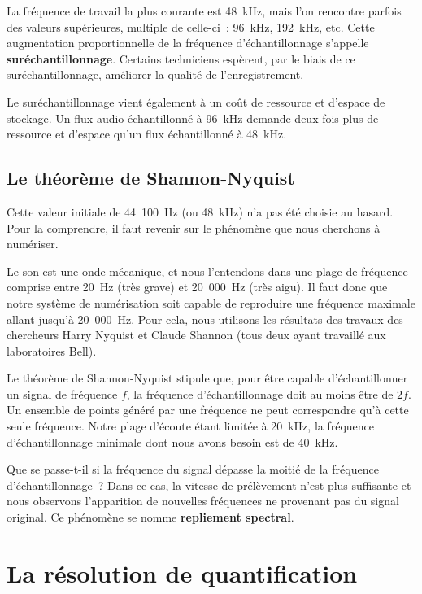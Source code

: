 \documentclass[
]{book}
\begin{document}
La fréquence de travail la plus courante est 48~kHz, mais l'on rencontre parfois des valeurs supérieures, multiple de celle-ci~: 96~kHz, 192~kHz, etc. Cette augmentation proportionnelle de la fréquence d'échantillonnage s'appelle \textbf{suréchantillonnage}. Certains techniciens espèrent, par le biais de ce suréchantillonnage, améliorer la qualité de l'enregistrement.

Le suréchantillonnage vient également à un coût de ressource et d'espace de stockage. Un flux audio échantillonné à 96~kHz demande deux fois plus de ressource et d'espace qu'un flux échantillonné à 48~kHz.

\hypertarget{le-thuxe9oruxe8me-de-shannon-nyquist}{%
\subsection{Le théorème de Shannon-Nyquist}\label{le-thuxe9oruxe8me-de-shannon-nyquist}}

Cette valeur initiale de 44~100~Hz (ou 48~kHz) n'a pas été choisie au hasard. Pour la comprendre, il faut revenir sur le phénomène que nous cherchons à numériser.

Le son est une onde mécanique, et nous l'entendons dans une plage de fréquence comprise entre 20~Hz (très grave) et 20~000~Hz (très aigu). Il faut donc que notre système de numérisation soit capable de reproduire une fréquence maximale allant jusqu'à 20~000~Hz. Pour cela, nous utilisons les résultats des travaux des chercheurs Harry Nyquist et Claude Shannon (tous deux ayant travaillé aux laboratoires Bell).

Le théorème de Shannon-Nyquist stipule que, pour être capable d'échantillonner un signal de fréquence \(f\), la fréquence d'échantillonnage doit au moins être de \(2f\). Un ensemble de points généré par une fréquence ne peut correspondre qu'à cette seule fréquence. Notre plage d'écoute étant limitée à 20~kHz, la fréquence d'échantillonnage minimale dont nous avons besoin est de 40~kHz.

Que se passe-t-il si la fréquence du signal dépasse la moitié de la fréquence d'échantillonnage~? Dans ce cas, la vitesse de prélèvement n'est plus suffisante et nous observons l'apparition de nouvelles fréquences ne provenant pas du signal original. Ce phénomène se nomme \textbf{repliement spectral}.

\hypertarget{la-ruxe9solution-de-quantification}{%
\section{La résolution de quantification}\label{la-ruxe9solution-de-quantification}}
\end{document}
